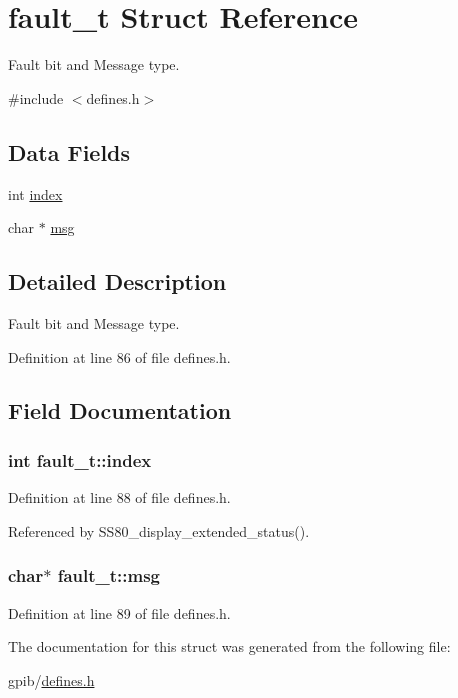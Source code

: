 \hypertarget{structfault__t}{}\section{fault\+\_\+t Struct Reference}
\label{structfault__t}


Fault bit and Message type.  




{\ttfamily \#include $<$defines.\+h$>$}

\subsection*{Data Fields}
\begin{DoxyCompactItemize}
\item 
int \hyperlink{structfault__t_a540c9496df912b65e22c50b6a40535ef}{index}
\item 
char $\ast$ \hyperlink{structfault__t_a9037306efc26edf60b59bc1ee6843c69}{msg}
\end{DoxyCompactItemize}


\subsection{Detailed Description}
Fault bit and Message type. 

Definition at line 86 of file defines.\+h.



\subsection{Field Documentation}
\subsubsection[{\texorpdfstring{index}{index}}]{\setlength{\rightskip}{0pt plus 5cm}int fault\+\_\+t\+::index}\hypertarget{structfault__t_a540c9496df912b65e22c50b6a40535ef}{}\label{structfault__t_a540c9496df912b65e22c50b6a40535ef}


Definition at line 88 of file defines.\+h.



Referenced by S\+S80\+\_\+display\+\_\+extended\+\_\+status().

\subsubsection[{\texorpdfstring{msg}{msg}}]{\setlength{\rightskip}{0pt plus 5cm}char$\ast$ fault\+\_\+t\+::msg}\hypertarget{structfault__t_a9037306efc26edf60b59bc1ee6843c69}{}\label{structfault__t_a9037306efc26edf60b59bc1ee6843c69}


Definition at line 89 of file defines.\+h.



The documentation for this struct was generated from the following file\+:\begin{DoxyCompactItemize}
\item 
gpib/\hyperlink{defines_8h}{defines.\+h}\end{DoxyCompactItemize}
